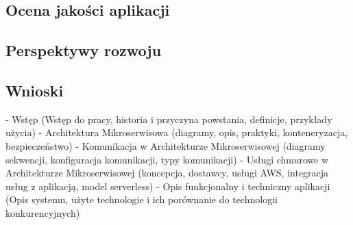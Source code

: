 \documentclass{article}
\begin{document}
	\subsection{Ocena jakości aplikacji}
	\subsection{Perspektywy rozwoju}
	\subsection{Wnioski}
		
	

- Wstęp (Wstęp do pracy, historia i przyczyna powstania, definicje, przykłady użycia)
- Architektura Mikroserwisowa (diagramy, opis, praktyki, konteneryzacja, bezpieczeństwo)
- Komunikacja w Architekturze Mikroserwisowej (diagramy sekwencji, konfiguracja komunikacji, typy komunikacji)
- Usługi chmurowe w Architekturze Mikroserwisowej (koncepcja, dostawcy, usługi AWS, integracja usług z aplikacją, model serverless)
- Opis funkcjonalny i techniczny aplikacji (Opis systemu, użyte technologie i ich porównanie do technologii konkurencyjnych)
 
\end{document}
